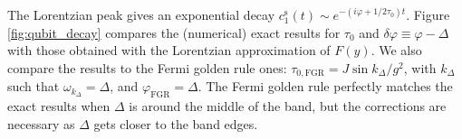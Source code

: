 \documentclass[aps,pra,twocolumn,floatfix,superscriptaddress]{revtex4-1}%
\begin{document}
The Lorentzian peak gives an exponential decay $c_1^\text{s}(t)\sim e^{-(i\varphi+1/2\tau_0)t}$. 
Figure \ref{fig:qubit_decay} compares the (numerical) exact results for $\tau_0$ and $\delta\varphi\equiv\varphi-\Delta$ with those obtained with the Lorentzian approximation of $F(y)$. {\color{blue}We also compare the results to the Fermi golden rule ones: $\tau_{0,\text{FGR}}=J\sin k_\Delta/g^2$, with $k_\Delta$ such that $\omega_{k_\Delta}=\Delta$, and $\varphi_\text{FGR}=\Delta$}. The Fermi golden rule perfectly matches the exact results when $\Delta$ is around the middle of the band, but {\color{blue}the corrections are} necessary as $\Delta$ gets closer to the band edges. %
\end{document}
